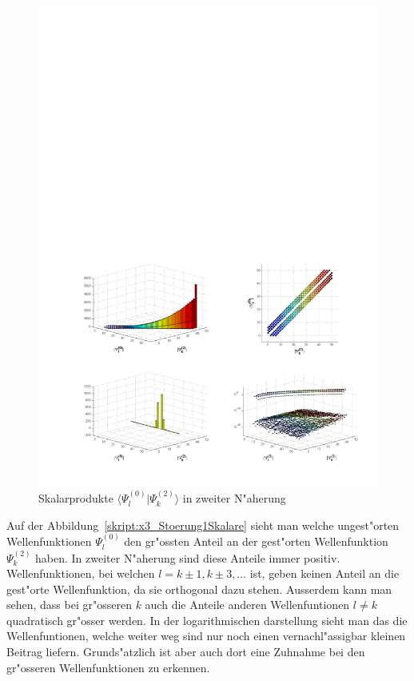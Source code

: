 \begin{refsection}
\begin{figure}[h]	%
\centering
\includegraphics[width=1.0\textwidth]{anharmonisch/images/x3/Stoerung2Skalare.pdf}
\caption{Skalarprodukte $\langle\Psi_l^{(0)}|\Psi_k^{(2)}\rangle$ in zweiter N"aherung
\label{skript:x3_Stoerung2Skalare}}
\end{figure}

Auf der Abbildung~\ref{skript:x3_Stoerung1Skalare} sieht man welche ungest"orten Wellenfunktionen $\Psi_l^{(0)}$ den gr"ossten Anteil an der gest"orten Wellenfunktion $\Psi_k^{(2)}$ haben. In zweiter N"aherung sind diese Anteile immer positiv.  Wellenfunktionen, bei welchen $l=k\pm 1,k\pm 3,\dots$ ist, geben keinen Anteil an die gest"orte Wellenfunktion, da sie orthogonal dazu stehen. Ausserdem kann man sehen, dass bei gr"osseren $k$ auch die Anteile anderen Wellenfuntionen $l\neq k$ quadratisch gr"osser werden. In der logarithmischen darstellung sieht man das die Wellenfuntionen, welche weiter weg sind nur noch einen vernachl"assigbar kleinen Beitrag liefern. Grunds"atzlich ist aber auch dort eine Zuhnahme bei den gr"osseren Wellenfunktionen zu erkennen.


\end{refsection}
